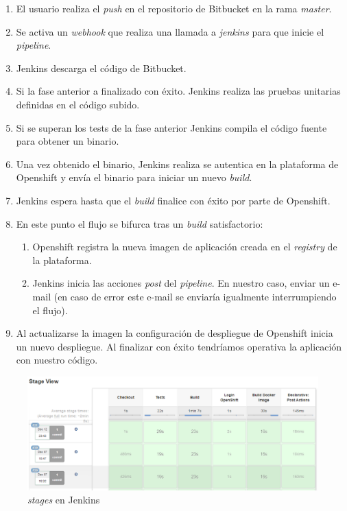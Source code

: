 \begin{enumerate}
\item El usuario realiza el \textit{push} en el repositorio de Bitbucket en la rama \textit{master}.

\item Se activa un \textit{webhook} que realiza una llamada a \textit{jenkins} para que inicie el \textit{pipeline}. 

\item Jenkins descarga el código de Bitbucket. 

\item Si la fase anterior a finalizado con éxito. Jenkins realiza las pruebas unitarias definidas en el código subido. 

\item Si se superan los tests de la fase anterior Jenkins compila el código fuente para obtener un binario.


\item Una vez obtenido el binario, Jenkins realiza se autentica en la plataforma de Openshift y envía el binario para iniciar un nuevo \textit{build}. 

\item Jenkins espera hasta que el \textit{build} finalice con éxito por parte de Openshift.

\item En este punto el flujo se bifurca tras un \textit{build} satisfactorio:  
	\begin{enumerate}
		\item Openshift registra la nueva imagen de aplicación creada en el \textit{registry} de la plataforma.

		\item Jenkins inicia las acciones \textit{post} del \textit{pipeline}. En nuestro caso, enviar un e-mail (en caso de error este e-mail se enviaría igualmente interrumpiendo el flujo). 
	\end{enumerate}

\item Al actualizarse la imagen la configuración de despliegue de Openshift inicia un nuevo despliegue. Al finalizar con éxito tendríamos operativa la aplicación con nuestro código.

\end{enumerate}

\begin{figure}[!ht]
	\centering
	\includegraphics[width=1\textwidth]{images/mant/jenkins-stages}
	\caption{\textit{stages} en Jenkins}
	\label{fig:jenkins}
\end{figure}


